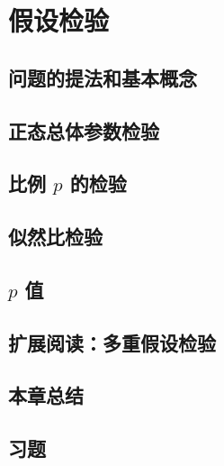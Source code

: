 \setcounter{chapter}{7} %
\chapter{假设检验}
\label{chap:study-hypothesis-testing}

\section{问题的提法和基本概念}
\label{sec:study-testing-concepts}

\section{正态总体参数检验}
\label{sec:study-normal-tests}

\section{比例 $p$ 的检验}
\label{sec:study-proportion-test}

\section{似然比检验}
\label{sec:study-likelihood-ratio}

\section{$p$ 值}
\label{sec:study-p-value}

\section{扩展阅读：多重假设检验}
\label{sec:study-multiple-testing}

\section*{本章总结}

\section*{习题}





